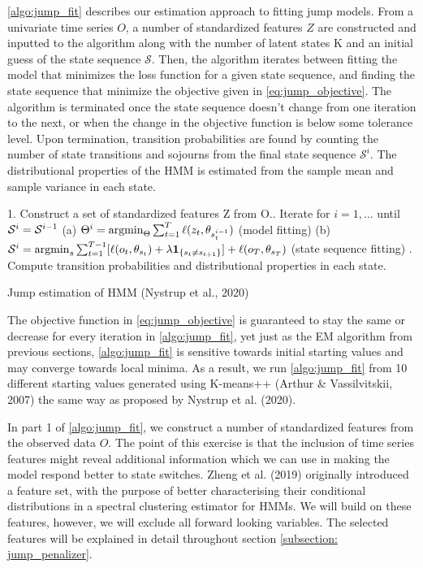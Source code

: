 \cref{algo:jump_fit} describes our estimation approach to fitting jump models. From a univariate time series $O$, a number of standardized features $Z$ are constructed and inputted to the algorithm along with the number of latent states K and an initial guess of the state sequence $\mathcal{S}$. Then, the algorithm iterates between fitting the model that minimizes the loss function for a given state sequence, and finding the state sequence that minimize the objective given in \cref{eq:jump_objective}. The algorithm is terminated once the state sequence doesn't change from one iteration to the next, or when the change in the objective function is below some tolerance level. Upon termination, transition probabilities are found by counting the number of state transitions and sojourns from the final state sequence $\mathcal{S}^i$. The distributional properties of the HMM is estimated from the sample mean and sample variance in each state.

\begin{algorithm}[H]
\BlankLine

1. Construct a set of standardized features Z from O.. Iterate for $i=1,\ldots$ until $\S^i=\S^{i-1}$ \;
\Indp
(a) $\Theta^i = \argmin_{\Theta} \sum_{t=1}^T \ell(z_t, \theta_{s_t^{i-1}})$ (model fitting)\;
(b) $\S^i = \argmin_s \sum_{t=1}^{T-1} [\ell(o_t, \theta_{s_t}) + \lambda\mathbf{1}_{\{ s_t\ne s_{t+1} \}}]
    + \ell(o_T, \theta_{s_T})$ (state sequence fitting)\;
. Compute transition probabilities and distributional properties in each state.\;
\BlankLine
{}

\caption{Jump estimation of HMM (Nystrup et al., 2020)}
\label{algo:jump_fit}
\end{algorithm}

The objective function in \cref{eq:jump_objective} is guaranteed to stay the same or decrease for every iteration in \cref{algo:jump_fit}, yet just as the EM algorithm from previous sections, \cref{algo:jump_fit} is sensitive towards initial starting values and may converge towards local minima. As a result, we run \cref{algo:jump_fit} from 10 different starting values generated using K-means++ (Arthur \& Vassilvitskii, 2007) the same way as proposed by Nystrup et al. (2020).

In part 1 of \cref{algo:jump_fit}, we construct a number of standardized features from the observed data $O$. The point of this exercise is that the inclusion of time series features might reveal additional information which we can use in making the model respond better to state switches. Zheng et al. (2019) originally introduced a feature set, with the purpose of better characterising their conditional distributions in a spectral clustering estimator for HMMs. We will build on these features, however, we will exclude all forward looking variables. The selected features will be explained in detail throughout section \ref{subsection: jump_penalizer}.

